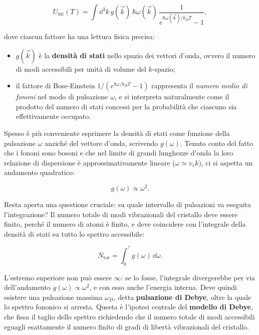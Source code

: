 \begin{importantbox}
    \begin{equation}
        U_{\text{int}}(T) = \int \dd^{3} k \, g(\vec{k}) \, \hbar \omega(\vec{k}) \, \frac{1}{e^{\hbar \omega(\vec{k}) / k_B T} - 1},
    \end{equation}
\end{importantbox}

dove ciascun fattore ha una lettura fisica precisa:

\begin{itemize}
    \item \( g(\vec{k}) \) è la \textbf{densità di stati} nello spazio dei vettori d'onda, ovvero il numero di modi accessibili per unità di volume del \( k \)-spazio;
    \item il fattore di Bose-Einstein \( 1/(e^{\hbar \omega / k_B T} - 1) \) rappresenta il \emph{numero medio di fononi} nel modo di pulsazione \( \omega \), e si interpreta naturalmente come il prodotto del numero di stati concessi per la probabilità che ciascuno sia effettivamente occupato.
\end{itemize}

Spesso è più conveniente esprimere la densità di stati come funzione della pulsazione \( \omega \) anziché del vettore d'onda, scrivendo \( g(\omega) \). Tenuto conto del fatto che i fononi sono bosoni e che nel limite di grandi lunghezze d'onda la loro relazione di dispersione è approssimativamente lineare (\( \omega \simeq v_s k \)), ci si aspetta un andamento quadratico:

\begin{equation}
    g(\omega) \propto \omega^{2}.
\end{equation}

Resta aperta una questione cruciale: su quale intervallo di pulsazioni va eseguita l'integrazione? Il numero totale di modi vibrazionali del cristallo deve essere finito, perché il numero di atomi è finito, e deve coincidere con l'integrale della densità di stati su tutto lo spettro accessibile:

\begin{equation}
    N_{\text{tot}} = \int_{0}^{?} g(\omega) \, \dd \omega.
\end{equation}

L'estremo superiore non può essere \( \infty \): se lo fosse, l'integrale divergerebbe per via dell'andamento \( g(\omega) \propto \omega^{2} \), e con esso anche l'energia interna. Deve quindi esistere una pulsazione massima \( \omega_D \), detta \textbf{pulsazione di Debye}, oltre la quale lo spettro fononico si arresta. Questa è l'ipotesi centrale del \textbf{modello di Debye}, che fissa il taglio dello spettro richiedendo che il numero totale di modi accessibili eguagli esattamente il numero finito di gradi di libertà vibrazionali del cristallo.


